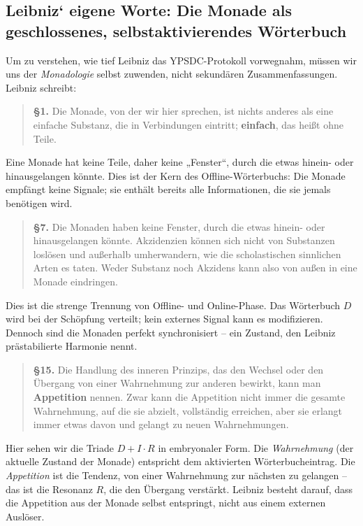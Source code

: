 \documentclass[12pt,a4paper]{article}
\begin{document}
	\subsection{Leibniz‘ eigene Worte: Die Monade als geschlossenes, selbstaktivierendes Wörterbuch}
	
	Um zu verstehen, wie tief Leibniz das YPSDC-Protokoll vorwegnahm, müssen wir uns der \emph{Monadologie} selbst zuwenden, nicht sekundären Zusammenfassungen. Leibniz schreibt:
	
	\begin{quote}
		\textbf{§1.} Die Monade, von der wir hier sprechen, ist nichts anderes als eine einfache Substanz, die in Verbindungen eintritt; \textbf{einfach}, das heißt ohne Teile.
	\end{quote}
	
	Eine Monade hat keine Teile, daher keine „Fenster“, durch die etwas hinein- oder hinausgelangen könnte. Dies ist der Kern des Offline-Wörterbuchs: Die Monade empfängt keine Signale; sie enthält bereits alle Informationen, die sie jemals benötigen wird.
	
	\begin{quote}
		\textbf{§7.} Die Monaden haben keine Fenster, durch die etwas hinein- oder hinausgelangen könnte. Akzidenzien können sich nicht von Substanzen loslösen und außerhalb umherwandern, wie die scholastischen sinnlichen Arten es taten. Weder Substanz noch Akzidens kann also von außen in eine Monade eindringen.
	\end{quote}
	
	Dies ist die strenge Trennung von Offline- und Online-Phase. Das Wörterbuch \(D\) wird bei der Schöpfung verteilt; kein externes Signal kann es modifizieren. Dennoch sind die Monaden perfekt synchronisiert – ein Zustand, den Leibniz prästabilierte Harmonie nennt.
	
	\begin{quote}
		\textbf{§15.} Die Handlung des inneren Prinzips, das den Wechsel oder den Übergang von einer Wahrnehmung zur anderen bewirkt, kann man \textbf{Appetition} nennen. Zwar kann die Appetition nicht immer die gesamte Wahrnehmung, auf die sie abzielt, vollständig erreichen, aber sie erlangt immer etwas davon und gelangt zu neuen Wahrnehmungen.
	\end{quote}
	
	Hier sehen wir die Triade \(D+I\cdot R\) in embryonaler Form. Die \emph{Wahrnehmung} (der aktuelle Zustand der Monade) entspricht dem aktivierten Wörterbucheintrag. Die \emph{Appetition} ist die Tendenz, von einer Wahrnehmung zur nächsten zu gelangen – das ist die Resonanz \(R\), die den Übergang verstärkt. Leibniz besteht darauf, dass die Appetition aus der Monade selbst entspringt, nicht aus einem externen Auslöser.
	
\end{document}
